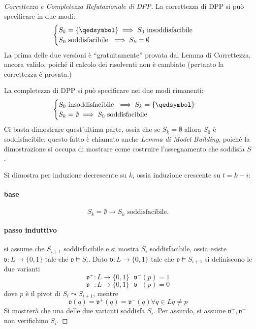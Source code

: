 \begin{proof}[Correttezza e Completezza Refutazionale di DPP]
        La correttezza di DPP si può specificare in due modi: 
        $$
        \begin{cases}
                S_k = \{\qedsymbol\} \implies S_0 \text{ insoddisfacibile } \\
                S_0 \text{ soddisfacibile } \implies S_k = \emptyset
        \end{cases}
        $$
        La prima delle due versioni è ``gratuitamente'' provata dal Lemma di Correttezza, 
        ancora valido, poiché il calcolo dei risolventi non è cambiato
        (pertanto la correttezza è provata.)

        La completezza di DPP si può specificare nei due modi rimanenti: 
        $$
        \begin{cases}
                S_0 \text{ insoddisfacibile } \implies S_k = \{\qedsymbol\} \\
                S_k = \emptyset \implies S_0 \text{ soddisfacibile } 

        \end{cases}
        $$
        Ci basta dimostrare quest'ultima parte, ossia che se 
        $S_k = \emptyset$ allora $S_0$ è soddisfacibile: 
        questo fatto è chiamato anche \textit{Lemma di Model Building}, poiché 
        la dimostrazione si occupa di mostrare come costruire l'assegnamento 
        che soddisfa $S$. 
        
        Si dimostra per induzione decrescente su $k$, ossia induzione 
        crescente su $t=k -i$:
        \paragraph{base}
        $$
        S_k = \emptyset \rightarrow S_k \text{ soddisfacibile.}
        $$
        \paragraph{passo induttivo} si assume che $S_{i+1}$ soddisfacibile e si mostra $S_i$ 
        soddisfacibile, ossia esiste $\mathfrak{v}: L \rightarrow \{0,1\}$ tale 
        che $\mathfrak{v} \models S_i$. Dato $\mathfrak{v} : L \rightarrow \{0,1\}$ 
        tale che $\mathfrak{v} \models S_{i+1}$ si definiscono le due varianti 
        $$
        \mathfrak{v}^+ : L \rightarrow \{0,1\} ~ ~ ~ \mathfrak{v}^+(p) = 1 
        $$
        $$
        \mathfrak{v}^- : L \rightarrow \{0,1\} ~ ~ ~ \mathfrak{v}^-(p) = 0
        $$
        dove $p$ è il pivot di $S_i \leadsto S_{i+1}$, 
        mentre 
        $$
        \mathfrak{v}(q) = \mathfrak{v}^+(q) = \mathfrak{v}^-(q) \forall q \in L q \neq p
        $$
        Si mostrerà che una delle due varianti soddisfa $S_i$. 
        Per assurdo, si assume $\mathfrak{v}^+, \mathfrak{v}^-$ non verifichino 
        $S_{i}$. 


\end{proof}
